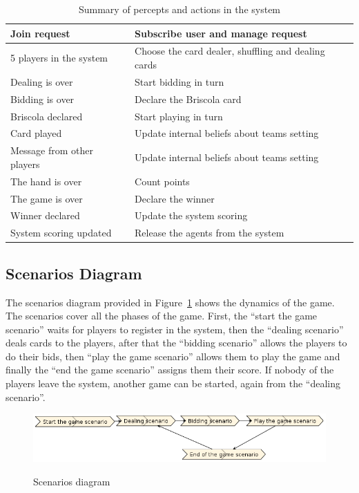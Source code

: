 \documentclass[a4paper]{article}
\begin{document}
\begin{table}[htp]
  \begin{tabular}{|l|l|}
    \hline
    Join request	& Subscribe user and manage request  \\
    \hline
    5 players in the system	& Choose the card dealer, shuffling and dealing cards  \\
    \hline
    Dealing is over	& Start bidding in turn \\
    \hline
    Bidding is over	& Declare the Briscola card \\ 
    \hline
    Briscola declared	& Start playing in turn \\
    \hline
    Card played	& Update internal beliefs about teams setting \\
    \hline
    Message from other players & Update internal beliefs about teams setting \\
    \hline
    The hand is over	& Count points \\
    \hline
    The game is over	& Declare the winner \\
    \hline
    Winner declared	 & Update the system scoring \\
    \hline
    System scoring updated	& Release the agents from the system \\
    \hline
  \end{tabular}
  \label{table:inout}
  \caption{Summary of percepts and actions in the system}
\end{table}

\subsection{Scenarios Diagram}

The scenarios diagram provided in Figure~\ref{fig:scenarios} shows the dynamics of the game. The scenarios cover all the phases of the game. First, the ``start the game scenario'' waits for players to register in the system, then the ``dealing scenario'' deals cards to the players, after that the ``bidding scenario'' allows the players to do their bids, then ``play the game scenario'' allows them to play the game and finally the ``end the game scenario'' assigns them their score. If nobody of the players leave the system, another game can be started, again from the ``dealing scenario''.

\begin{figure}[htp]
  \includegraphics[keepaspectratio,scale=0.5]{pdt/images/system_specification/scenarios.png}
  \label{fig:scenarios}
  \caption{Scenarios diagram}
\end{figure}
\end{document}
